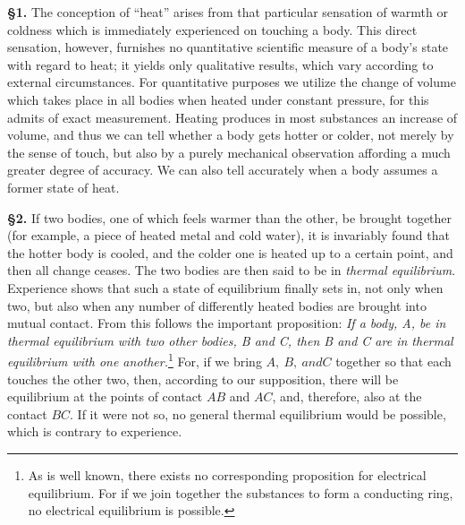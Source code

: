 \documentclass[oneside,12pt]{book}
\newcommand{\iit}[1]{\textit{#1}}
\begin{document}
\textbf{\S 1.} The conception of ``heat'' arises from that particular sensation of warmth or coldness which is immediately experienced on touching a body. This direct sensation, however, furnishes no quantitative scientific measure of a body's state with regard to heat; it yields only qualitative results, which vary according to external circumstances. For quantitative purposes we utilize the change of volume which takes place in all bodies when heated under constant pressure, for this admits of exact measurement. Heating produces in most substances an increase of volume, and thus we can tell whether a body gets hotter or colder, not merely by the sense of touch, but also by a purely mechanical observation affording a much greater degree of accuracy. We can also tell accurately when a body assumes a former state of heat. \par

\textbf{\S 2.} If two bodies, one of which feels warmer than the other, be brought together (for example, a piece of heated metal and cold water), it is invariably found that the hotter body is cooled, and the colder one is heated up to a certain point, and then all change ceases. The two bodies are then said to be in \iit{thermal equilibrium}. Experience shows that such a state of equilibrium finally sets in, not only when two, but also when any number of differently heated bodies are brought into mutual contact. From this follows the important proposition: \iit{If a body, A, be in thermal equilibrium with two other bodies, B and C, then B and C are in thermal equilibrium with one another.}\footnote[1]{As is well known, there exists no corresponding proposition for electrical equilibrium. For if we join together the substances  to form a conducting ring, no electrical equilibrium is possible.} For, if we bring $A,\ B,\ and C$ together so that each touches the other two, then, according to our supposition, there will be equilibrium at the points of contact $AB$ and $AC$, and, therefore, also at the contact $BC$. If it were not so, no general thermal equilibrium would be possible, which is contrary to experience. \par
\end{document}
